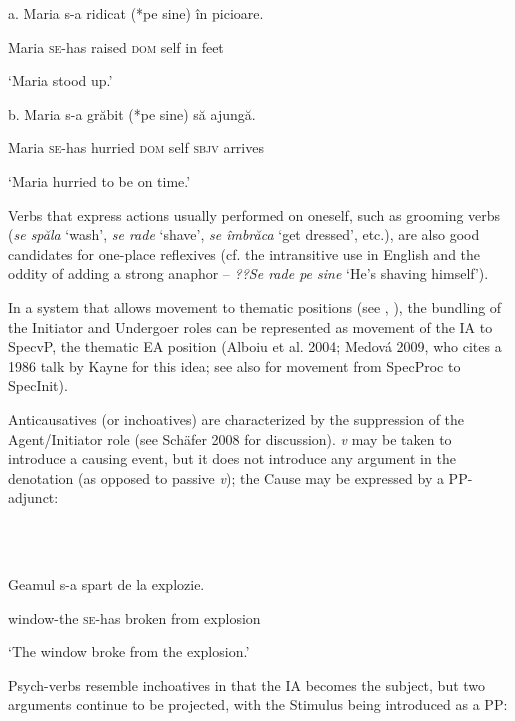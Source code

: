 \documentclass[output=paper]{langsci/langscibook}
\begin{document}
          a.   Maria s-a      ridicat (*pe     sine) în picioare.

                 Maria \textsc{se-}has raised     \textsc{dom} self   in feet

       ‘Maria stood up.’

b.   Maria s-a        grăbit   (*pe     sine)   să     ajungă.

      Maria \textsc{se-}has  hurried    \textsc{dom}  self    \textsc{sbjv} arrives 

      ‘Maria hurried to be on time.’ 

Verbs that express actions usually performed on oneself, such as grooming verbs (\textit{se spăla} ‘wash’, \textit{se rade} ‘shave’, \textit{se îmbrăca} ‘get dressed’, etc.), are also good candidates for one-place reflexives (cf. the intransitive use in English and the oddity of adding a strong anaphor – \textit{??Se rade pe sine} ‘He’s shaving himself’).

  In a system that allows movement to thematic positions (see \citealt{Hornstein1999}, \citealt{Ramchand2008}), the bundling of the Initiator and Undergoer roles can be represented as movement of the IA to SpecvP, the thematic EA position (Alboiu et al. 2004; Medová 2009, who cites a 1986 talk by Kayne for this idea; see also \citealt{Ramchand2008} for movement from SpecProc to SpecInit).

  Anticausatives (or inchoatives) are characterized by the suppression of the Agent/Initiator role (see Schäfer 2008 for discussion). \textit{v} may be taken to introduce a causing event, but it does not introduce any argument in the denotation (as opposed to passive \textit{v}); the Cause may be expressed by a PP-adjunct: 

\ea%
    \label{ex:key:57}
    \gll\\
        \\
    \glt
    \z

          Geamul        s-a      spart    de la  explozie.

window-the \textsc{se-}has broken from explosion

‘The window broke from the explosion.’

Psych-verbs resemble inchoatives in that the IA becomes the subject, but two arguments continue to be projected, with the Stimulus being introduced as a PP:

\ea%
    \label{ex:key:58}
    \gll\\
        \\
    \glt
    \z
\end{document}
